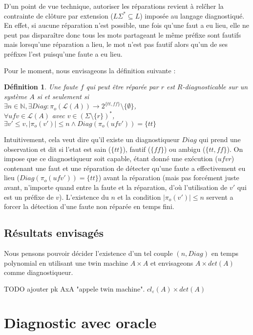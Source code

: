 \documentclass[a4paper,10pt]{article}
\newtheorem{mydef}{D\'efinition}
\begin{document}
D'un point de vue technique, autoriser les r\'eparations revient \`a rel\^cher la contrainte de cl\^oture par extension ($L\Sigma^*\subseteq L$) impos\'ee au langage diagnostiqu\'e. En effet, si aucune r\'eparation n'est possible, une fois qu'une faut a eu lieu, elle ne peut pas dispara\^itre donc tous les mots partageant le m\^eme pr\'efixe sont fautifs mais lorsqu'une r\'eparation a lieu, le mot n'est pas fautif alors qu'un de ses pr\'efixes l'est puisqu'une faute a eu lieu.

Pour le moment, nous envisageons la d\'efinition suivante :

\begin{mydef}
  Une faute $f$ qui peut \^etre r\'epar\'ee par $r$ est $R$-diagnosticable sur un syst\`eme $A$ si et seulement si\\
  $\exists n \in \mathbb N,\exists Diag : \pi_o(\mathcal L(A)) \to 2^{\{tt, ff\}}\setminus \{\emptyset\}$,\\
  $\forall ufv\in \mathcal L(A)$ avec $v\in \left(\Sigma\setminus \{r\}\right)^*$,\\
  $\exists v'\le v, |\pi_o(v')| \le n \land Diag(\pi_o(ufv'))=\{tt\}$
\end{mydef}

Intuitivement, cela veut dire qu'il existe un diagnostiqueur $Diag$ qui prend une observation et dit si l'etat est sain ($\{tt\}$), fautif ($\{ff\}$) ou ambigu ($\{tt, ff\}$). On impose que ce diagnostiqueur soit capable, \'etant donn\'e une ex\'ecution ($ufvr$) contenant une faut et une r\'eparation de d\'etecter qu'une faute a effectivement eu lieu ($Diag(\pi_o(ufv'))=\{tt\}$) avant la r\'eparation (mais pas forc\'ement juste avant, n'importe quand entre la faute et la r\'eparation, d'o\`u l'utilisation de $v'$ qui est un pr\'efixe de $v$). L'existence du $n$ et la condition $|\pi_o(v')| \le n$ servent a forcer la d\'etection d'une faute non r\'epar\'ee en temps fini.

\subsection{R\'esultats envisag\'es}

Nous pensons pouvoir d\'ecider l'existence d'un tel couple $(n, Diag)$ en temps polynomial en utilisant une twin machine $A\times A$ et envisageons $A\times det(A)$ comme diagnostiqueur.

TODO ajouter pk AxA "appele twin machine". $cl_\varepsilon(A)\times det(A)$

\section{Diagnostic avec oracle}
\end{document}
